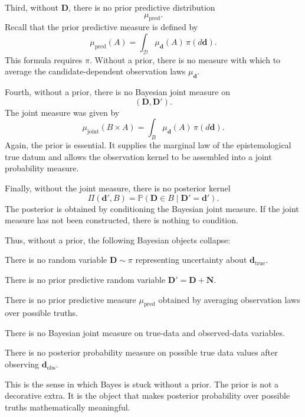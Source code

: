 \documentclass[11pt]{article}
\newcommand{\Dspace}{\mathcal D}
\newcommand{\prior}{\pi}
\newcommand{\Drand}{\mathbf D}
\newcommand{\Dobsrand}{\mathbf D'}
\newcommand{\Nrand}{\mathbf N}
\newcommand{\dtrue}{\mathbf d_{\mathrm{true}}}
\newcommand{\dobs}{\mathbf d_{\mathrm{obs}}}
\newcommand{\Prob}{\mathbb P}
\begin{document}
Third, without \(\Drand\), there is no prior predictive distribution
\[
    \mu_{\mathrm{pred}}.
\]
Recall that the prior predictive measure is defined by
\[
    \mu_{\mathrm{pred}}(A)
    =
    \int_{\Dspace}
        \mu_{\mathbf d}(A)
    \,\prior(d\mathbf d).
\]
This formula requires \(\prior\). Without a prior, there is no measure with which to average the candidate-dependent observation laws \(\mu_{\mathbf d}\).

Fourth, without a prior, there is no Bayesian joint measure on
\[
    (\Drand,\Dobsrand).
\]
The joint measure was given by
\[
    \mu_{\mathrm{joint}}(B\times A)
    =
    \int_B
        \mu_{\mathbf d}(A)
    \,\prior(d\mathbf d).
\]
Again, the prior is essential. It supplies the marginal law of the epistemological true datum and allows the observation kernel to be assembled into a joint probability measure.

Finally, without the joint measure, there is no posterior kernel
\[
    \Pi(\mathbf d',B)
    =
    \Prob(\Drand\in B\mid \Dobsrand=\mathbf d').
\]
The posterior is obtained by conditioning the Bayesian joint measure. If the joint measure has not been constructed, there is nothing to condition.

Thus, without a prior, the following Bayesian objects collapse:
\begin{description}[leftmargin=3.2cm,style=nextline]
    \item[Epistemological truth.]
    There is no random variable \(\Drand\sim\prior\) representing uncertainty about \(\dtrue\).

    \item[Bayesian predictive datum.]
    There is no prior predictive random variable \(\Dobsrand=\Drand+\Nrand\).

    \item[Prior predictive law.]
    There is no prior predictive measure \(\mu_{\mathrm{pred}}\) obtained by averaging observation laws over possible truths.

    \item[Joint measure.]
    There is no Bayesian joint measure on true-data and observed-data variables.

    \item[Posterior kernel.]
    There is no posterior probability measure on possible true data values after observing \(\dobs\).
\end{description}

This is the sense in which Bayes is stuck without a prior. The prior is not a decorative extra. It is the object that makes posterior probability over possible truths mathematically meaningful.
\end{document}
